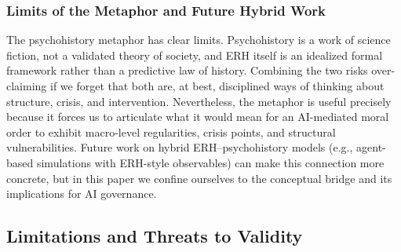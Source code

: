 \documentclass[12pt,a4paper]{article}
\theoremstyle{definition}
\theoremstyle{remark}
\begin{document}
\subsubsection{Limits of the Metaphor and Future Hybrid Work}

The psychohistory metaphor has clear limits.
Psychohistory is a work of science fiction, not a validated theory of society, and ERH itself is an idealized formal framework rather than a predictive law of history.
Combining the two risks over-claiming if we forget that both are, at best, disciplined ways of thinking about structure, crisis, and intervention.
Nevertheless, the metaphor is useful precisely because it forces us to articulate what it would mean for an AI-mediated moral order to exhibit macro-level regularities, crisis points, and structural vulnerabilities.
Future work on hybrid ERH--psychohistory models (e.g., agent-based simulations with ERH-style observables) can make this connection more concrete, but in this paper we confine ourselves to the conceptual bridge and its implications for AI governance.

\subsection{Limitations and Threats to Validity}
\end{document}
